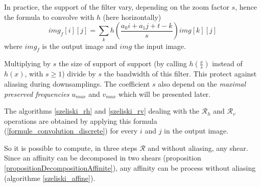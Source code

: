 	In practice, the support of the filter vary, depending on the zoom factor $s$, hence the formula to convolve with $h$ (here horizontally)
	\begin{equation}
	img_f[i][j] = \displaystyle{\sum_k}h\left(\frac{a_0i+a_1j+t-k}{s}\right)img[k][j]
	\label{formule_convolution_discrete}
	\end{equation}
	where $img_f$ is the output image and $img$ the input image.
	
	
	
	Multiplying by $s$ the size of support of support (by calling $h(\frac{x}{s})$ instead of $h(x)$, with $s\geq 1$) divide by $s$ the bandwidth of this filter. This protect against aliasing during downsamplings. The coefficient $s$ also depend on the \emph{maximal preserved frequencies} $u_{max}$ and $v_{max}$ which will be presented later.
	
	
	The algorithms \ref{szeliski_rh} and \ref{szeliski_rv} dealing with the $\mathcal R_h$ and $\mathcal R_v$ operations are obtained by applying this formula (\ref{formule_convolution_discrete}) for every $i$ and $j$ in the output image. \label{szeliski_rv_rh_section}
	
	
	So it is possible to compute, in three steps $\mathcal R$ and without aliasing, any shear. Since an affinity can be decomposed in two shears (proposition \ref{propositionDecompositionAffinite}), any affinity can be process without aliasing (algorithme \ref{szeliski_affine}).
	

